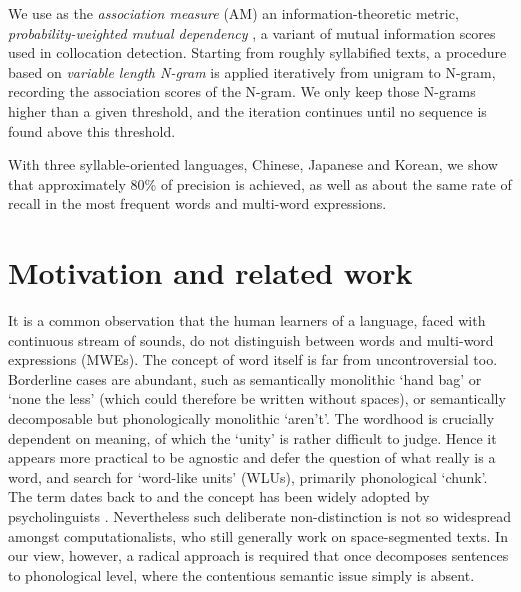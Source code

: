 \documentclass[a4]{article}
\begin{document}
We use as the \emph{association measure} (AM) an information-theoretic metric, \emph{probability-weighted mutual dependency} \cite{ThanopoulosEtAl02}, a variant of mutual information scores used in collocation detection. Starting from roughly syllabified texts, a procedure based on \emph{variable length N-gram}\cite{KeplerEtAl12} is applied iteratively from unigram to N-gram, recording the association scores of the N-gram. We only keep those N-grams higher than a given threshold, and the iteration continues until no sequence is found above this threshold.

With three syllable-oriented languages, Chinese, Japanese and Korean, we show that approximately  80\% of precision is achieved, as well as about the same rate of recall in the most frequent words and multi-word expressions.


\section{Motivation and related work}

It is a common observation that the human learners of a language, faced with continuous stream of sounds, do not distinguish between words and multi-word expressions (MWEs). The concept of word itself is far from uncontroversial too. Borderline cases are abundant, such as semantically monolithic `hand bag' or `none the less' (which could therefore be written without spaces), or semantically decomposable but phonologically monolithic `aren't'. The wordhood is crucially dependent on meaning, of which the `unity' is rather difficult to judge. Hence it appears more practical to be agnostic and defer the question of what really is a word, and search for `word-like units' (WLUs), primarily phonological `chunk'. The term dates back to \cite{Zwicky90_syntacticWords} and the concept has been widely adopted by psycholinguists \cite{Swingley05_clustering,EndressMehler09,PerruchetPoulinCharronat12}. Nevertheless such deliberate non-distinction is not so widespread amongst computationalists, who still generally work on space-segmented texts. In our view, however, a radical approach is required that once decomposes sentences to phonological level, where the contentious semantic issue simply is absent.
\end{document}
